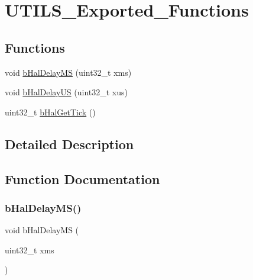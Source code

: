 \hypertarget{group___u_t_i_l_s___exported___functions}{}\section{U\+T\+I\+L\+S\+\_\+\+Exported\+\_\+\+Functions}
\label{group___u_t_i_l_s___exported___functions}
\subsection*{Functions}
\begin{DoxyCompactItemize}
\item 
void \mbox{\hyperlink{group___u_t_i_l_s___exported___functions_gaa182576041a2f75efbe74e38ef0a5be2}{b\+Hal\+Delay\+MS}} (uint32\+\_\+t xms)
\item 
void \mbox{\hyperlink{group___u_t_i_l_s___exported___functions_ga7e7ef920e4c7a4c6d27a646cb3c88a8d}{b\+Hal\+Delay\+US}} (uint32\+\_\+t xus)
\item 
uint32\+\_\+t \mbox{\hyperlink{group___u_t_i_l_s___exported___functions_gac8e750b2b439b1cc756a4076503738e4}{b\+Hal\+Get\+Tick}} ()
\end{DoxyCompactItemize}


\subsection{Detailed Description}


\subsection{Function Documentation}
\mbox{\label{group___u_t_i_l_s___exported___functions_gaa182576041a2f75efbe74e38ef0a5be2}} 
\subsubsection{\texorpdfstring{b\+Hal\+Delay\+M\+S()}{bHalDelayMS()}}
{\footnotesize\ttfamily void b\+Hal\+Delay\+MS (\begin{DoxyParamCaption}\item[{uint32\+\_\+t}]{xms }\end{DoxyParamCaption})}



